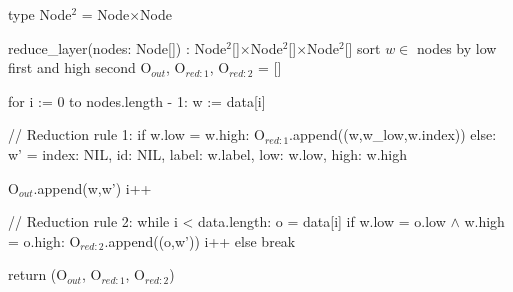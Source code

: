 \begin{blstlisting}
  type Node$^2$ = Node$\times$Node

  reduce_layer(nodes: Node[]) : Node$^2$[]$\times$Node$^2$[]$\times$Node$^2$[]
    sort $w \in $ nodes by low first and high second
    O$_{\mathit{out}}$, O$_{\mathit{red:}1}$, O$_{\mathit{red:}2}$ = []

    for i := 0 to nodes.length - 1:
      w := data[i]

      // Reduction rule 1:
      if w.low = w.high:
        O$_{\mathit{red:}1}$.append((w,w_low,w.index))
      else:
        w' = {
          index: NIL,
          id: NIL,
          label: w.label,
          low: w.low,
          high: w.high
        }

        O$_{\mathit{out}}$.append(w,w')
        i++

        // Reduction rule 2:
        while i < data.length:
          o = data[i]
          if w.low = o.low $\land$ w.high = o.high:
            O$_{\mathit{red:}2}$.append((o,w'))
            i++
          else break

    return (O$_{\mathit{out}}$, O$_{\mathit{red:}1}$, O$_{\mathit{red:}2}$)
\end{blstlisting}
